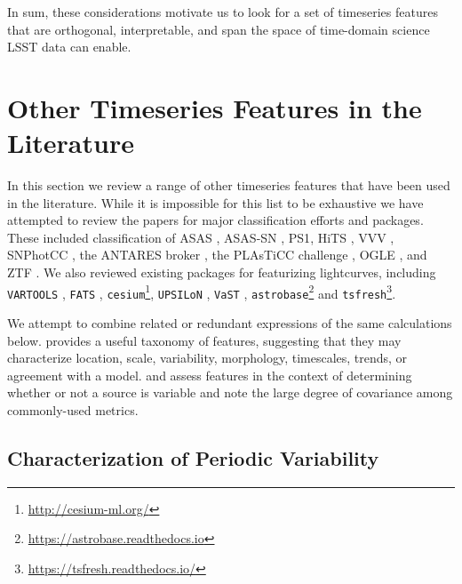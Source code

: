\documentclass[DM,authoryear,toc]{lsstdoc}
\begin{document}
In sum, these considerations motivate us to look for a set of timeseries features that are orthogonal, interpretable, and span the space of time-domain science LSST data can enable.

\section{Other Timeseries Features in the Literature}

In this section we review a range of other timeseries features that have been used in the literature.
While it is impossible for this list to be exhaustive we have attempted to review the papers for major classification efforts and packages.
These included classification of ASAS \citep{Richards:12:ASASCatalog}, ASAS-SN \citep{Jayasinghe:18:ASASSNVarsI,Jayasinghe:19:ASASSNVarsII,Jayasinghe:19:ASASSNVarsIII,Jayasinghe:20:ASASSNVarsV}, PS1\citep{Hernitschek:16:PS1SF, Villar:20:SuperRAENN}, HiTS \citep{Martinez-Palomera:18:HiTS}, VVV \citep{Elorrieta:16:A-machine-learn}, SNPhotCC \citep{Kessler:10:SNPhotCC}, the ANTARES broker \citep{Narayan:18:ANTARES}, the PLAsTiCC challenge \citep{Malz:19:PLAsTiCC,Kessler:19:PlasticcModels, Boone:19:AvocadoClassifier}, OGLE \citep{Pashchenko:18:OGLEClassification}, and ZTF \citep{Sanchez-Saez:21:AlertClassification, tmp_Coughlin:20:ZTFClassification}. 
We also reviewed existing packages for featurizing lightcurves, including \texttt{VARTOOLS} \citep{Hartman:16:VARTOOLS}, \texttt{FATS} \citep{Nun:15:FATS}, \texttt{cesium}\footnote{\url{http://cesium-ml.org/}}, \texttt{UPSILoN} \citep{Kim:16:UPSILoN}, \texttt{VaST} \citep{Sokolovsky:18:VaST}, \texttt{astrobase}\footnote{\url{https://astrobase.readthedocs.io}} and \texttt{tsfresh}\footnote{\url{https://tsfresh.readthedocs.io/}}.

We attempt to combine related or redundant expressions of the same calculations below.
\citet{Graham:17:VariableClassificationChallenges} provides a useful taxonomy of features, suggesting that they may characterize location, scale, variability, morphology, timescales, trends, or agreement with a model. 
\citet{Sokolovsky:17:VariabilityDetection} and \citet{Pashchenko:18:OGLEClassification} assess features in the context of determining whether or not a source is variable and note the large degree of covariance among commonly-used metrics.




\subsection{Characterization of Periodic Variability}
\end{document}
